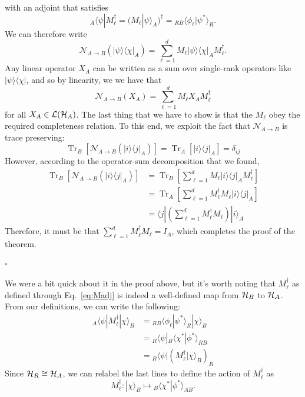 \documentclass[a4paper,11pt]{article}
\newcommand{\eop}{{\hspace*{\fill}$\square$}}
\newcommand{\Eq}[1]{Eq.~\eqref{#1}}
\DeclareMathOperator{\Tr}{Tr}
\newcommand{\bra}[1]{\langle #1|}
\newcommand{\ket}[1]{|#1\rangle}
\newcommand{\braket}[2]{\langle #1|#2\rangle}
\newcommand{\ketbra}[2]{| #1 \rangle \langle #2 |}
\newcommand{\Hil}{{\cal H}}
\begin{document}
with an adjoint that satisfies
\begin{equation} \label{eq:Madj}
{}_A\bra{\psi} M_\ell^\dagger = (M_\ell \ket{\psi}_A )^\dagger = {}_{RB} \braket{\phi_\ell}{\psi^*}_R .
\end{equation}
We can therefore write
\begin{equation} \label{eq:state2channel}
\mathcal{N}_{A \rightarrow B}(\ketbra{\psi}{\chi}_A) = \sum_{\ell = 1}^d M_\ell \ketbra{\psi}{\chi}_A M_\ell^\dagger.
\end{equation}
Any linear operator $X_A$ can be written as a sum over single-rank operators like $\ketbra{\psi}{\chi}$, and so by linearity, we we have that
\begin{equation}
\mathcal{N}_{A \rightarrow B}(X_A) = \sum_{\ell=1}^d M_\ell X_A M_\ell^\dagger
\end{equation}
for all $X_A \in \mathcal{L}(\Hil_A)$.
The last thing that we have to show is that the $M_\ell$ obey the required completeness relation.
To this end, we exploit the fact that $\mathcal{N}_{A \rightarrow B}$ is trace preserving:
\begin{equation}
\Tr_B[\mathcal{N}_{A \rightarrow B}(\ketbra{i}{j}_A)] = \Tr_A[ \ketbra{i}{j}_A] = \delta_{ij}
\end{equation}
However, according to the operator-sum decomposition that we found,
\begin{align*}
\Tr_B[\mathcal{N}_{A \rightarrow B}(\ketbra{i}{j}_A)] &= \Tr_B \left[ \sum_{\ell=1}^d M_\ell \ketbra{i}{j}_A M_\ell^\dagger  \right] \\
&= \Tr_A \left[ \sum_{\ell=1}^d  M_\ell^\dagger M_\ell   \ketbra{i}{j}_A \right] \\
&= \bra{j} \left( \sum_{\ell=1}^d  M_\ell^\dagger M_\ell \right) \ket{i}_A
\end{align*}
Therefore, it must be that $\sum_{\ell=1}^d M_\ell^\dagger M_\ell = I_A$, which completes the proof of the theorem.

\eop


We were a bit quick about it in the proof above, but it's worth noting that $M_\ell^\dagger$ as defined through \Eq{eq:Madj} is indeed a well-defined map from $\Hil_B$ to $\Hil_A$.
From our definitions, we can write the following:
\begin{align*}
{}_A \bra{\psi} M_\ell^\dagger \ket{\chi}_B &= {}_{RB}\braket{\phi_\ell}{\psi^*}_R \ket{\chi}_B \\
&= {}_R \bra{\psi} {}_B \braket{\chi^*}{\phi^*}_{RB} \\
&= {}_R\bra{\psi} (M^\dagger_\ell \ket{\chi}_B )_R
\end{align*}
Since $\Hil_R \cong \Hil_A$, we can relabel the last lines to define the action of $M_\ell^\dagger$ as
\begin{equation}
M_\ell^\dagger : \ket{\chi}_B \mapsto {}_B\braket{\chi^*}{\phi^*}_{AB}.
\end{equation}
\end{document}
